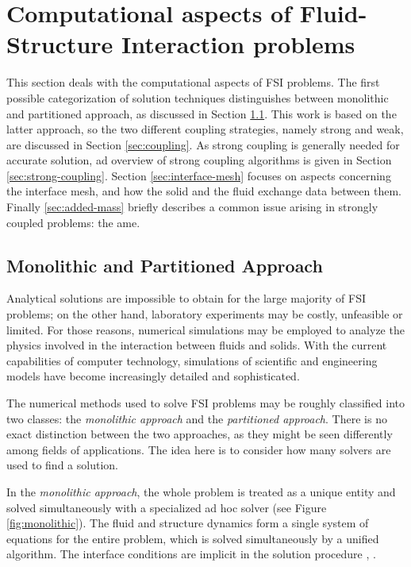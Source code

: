 \chapter{Computational aspects of Fluid-Structure Interaction problems}
\label{cha:computation}

This section deals with the computational aspects of FSI problems. The first possible categorization of solution techniques distinguishes between monolithic and partitioned approach, as discussed in Section \ref{sec:monolithic}. This work is based on the latter approach, so the two different coupling strategies, namely strong and weak, are discussed in Section \ref{sec:coupling}. As strong coupling is generally needed for accurate solution, ad overview of strong coupling algorithms is given in Section \ref{sec:strong-coupling}. Section \ref{sec:interface-mesh} focuses on aspects concerning the interface mesh, and how the solid and the fluid exchange data between them. Finally \ref{sec:added-mass} briefly describes a common issue arising in strongly coupled problems: the \acrfull{ame}.


\section{Monolithic and Partitioned Approach}
\label{sec:monolithic}

Analytical solutions are impossible to obtain for the large majority of FSI problems; on the other hand, laboratory experiments may be costly, unfeasible or limited. For those reasons, numerical simulations may be employed to analyze the physics involved in the interaction between fluids and solids. With the current capabilities of computer technology, simulations of scientific and engineering models have become increasingly detailed and sophisticated.

The numerical methods used to solve FSI problems may be roughly classified into two classes: the \textit{monolithic approach} and the \textit{partitioned approach}. There is no exact distinction between the two approaches, as they might be seen differently among fields of applications. The idea here is to consider how many solvers are used to find a solution.

In the \textit{monolithic approach}, the whole problem is treated as a unique entity and solved simultaneously with a specialized ad hoc solver (see Figure \ref{fig:monolithic}). The fluid and structure dynamics form a single system of equations for the entire problem, which is solved simultaneously by a unified algorithm. The interface conditions are implicit in the solution procedure \cite{hubner2004monolithic}, \cite{ryzhakov2010monolithic}.

